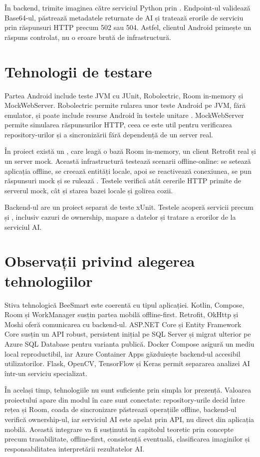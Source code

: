 În backend,  trimite imaginea către serviciul Python prin . Endpoint-ul  validează Base64-ul, păstrează metadatele  returnate de AI și tratează erorile de serviciu prin răspunsuri HTTP precum 502 sau 504. Astfel, clientul Android primește un răspuns controlat, nu o eroare brută de infrastructură.

\section{Tehnologii de testare}

Partea Android include teste JVM cu JUnit, Robolectric, Room in-memory și MockWebServer. Robolectric permite rularea unor teste Android pe JVM, fără emulator, și poate include resurse Android în testele unitare \cite{robolectricDocs}. MockWebServer permite simularea răspunsurilor HTTP, ceea ce este util pentru verificarea repository-urilor și a sincronizării fără dependență de un server real.

În proiect există un , care leagă o bază Room in-memory, un client Retrofit real și un server mock. Această infrastructură testează scenarii offline-online: se setează aplicația offline, se creează entități locale, apoi se reactivează conexiunea, se pun răspunsuri mock și se rulează . Testele verifică atât cererile HTTP primite de serverul mock, cât și starea bazei locale și golirea cozii.

Backend-ul are un proiect separat de teste xUnit. Testele acoperă servicii precum  și , inclusiv cazuri de ownership, mapare a datelor și tratare a erorilor de la serviciul AI.
\section{Observații privind alegerea tehnologiilor}

Stiva tehnologică BeeSmart este coerentă cu tipul aplicației. Kotlin, Compose, Room și WorkManager susțin partea mobilă offline-first. Retrofit, OkHttp și Moshi oferă comunicarea cu backend-ul. ASP.NET Core și Entity Framework Core susțin un API robust, persistent inițial pe SQL Server și migrat ulterior pe Azure SQL Database pentru varianta publică. Docker Compose asigură un mediu local reproductibil, iar Azure Container Apps găzduiește backend-ul accesibil utilizatorilor. Flask, OpenCV, TensorFlow și Keras permit separarea analizei AI într-un serviciu specializat.

În același timp, tehnologiile nu sunt suficiente prin simpla lor prezență. Valoarea proiectului apare din modul în care sunt conectate: repository-urile decid între rețea și Room, coada de sincronizare păstrează operațiile offline, backend-ul verifică ownership-ul, iar serviciul AI este apelat prin API, nu direct din aplicația mobilă. Această integrare va fi susținută în capitolul teoretic prin concepte precum trasabilitate, offline-first, consistență eventuală, clasificarea imaginilor și responsabilitatea interpretării rezultatelor AI.
